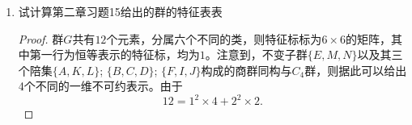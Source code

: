 \documentclass[reqno,a4paper,12pt]{amsart}
\begin{document}
\begin{enumerate}[1.]
\begin{proof}
考虑$T_z^2$在相似变换前后的矩阵形式，记$D(R) = D^T(R) \times D^T(R)$。
\[
	D(T_z^2) = \mathbf{diag}\{1,1,-1, 1,1,-1, -1,-1,1\};
\]
\[
	X^{-1}D(T_z^2)X = \mathbf{diag}\{1,1,1, -1,-1,1, -1,-1,1\}.
\]

对于$R_1$有：
\[
	X^{-1}D(R_1) X = \left( \begin{matrix}
		1 & 0 & 0 & 0 & 0 & 0 & 0 & 0 & 0 \\
		0 & \omega & 0 & 0 & 0 & 0 & 0 & 0 & 0 \\
		0 & 0 & \omega^2 & 0 & 0 & 0 & 0 & 0 & 0 \\
		0 & 0 & 0 & 0 & 0 & 1 & 0 & 0 & 0 \\
		0 & 0 & 0 & 1 & 0 & 0 & 0 & 0 & 0 \\
		0 & 0 & 0 & 0 & 1 & 0 & 0 & 0 & 0 \\
		0 & 0 & 0 & 0 & 0 & 0 & 0 & 0 & 1 \\
		0 & 0 & 0 & 0 & 0 & 0 & 1 & 0 & 0 \\
		0 & 0 & 0 & 0 & 0 & 0 & 0 & 1 & 0 \\
	\end{matrix} \right)
\]

从而可以求解得到相似变换矩阵$X$如下
\[
	X = \left( \begin{matrix}
		1 & 1 & 1 & 0 & 0 & 0 & 0 & 0 & 0 \\
		0 & 0 & 0 & 0 & 0 & 1 & 0 & 0 & 0 \\
		0 & 0 & 0 & 0 & 0 & 0 & 0 & 1 & 0 \\
		0 & 0 & 0 & 0 & 0 & 0 & 0 & 0 & 1 \\
		1 & \omega^2 & \omega & 0 & 0 & 0 & 0 & 0 & 0 \\
		0 & 0 & 0 & 1 & 0 & 0 & 0 & 0 & 0 \\
		0 & 0 & 0 & 0 & 1 & 0 & 0 & 0 & 0 \\
		0 & 0 & 0 & 0 & 0 & 0 & 1 & 0 & 0 \\
		1 & \omega & \omega^2 & 0 & 0 & 0 & 0 & 0 & 0 \\
	\end{matrix} \right)
\]
\end{proof}

\medskip

\item 试计算第二章习题15给出的群的特征表表

\begin{proof}
群$G$共有$12$个元素，分属六个不同的类，则特征标标为$6\times6$的矩阵，其中第一行为恒等表示的特征标，均为$1$。注意到，不变子群$\{E, M, N\}$以及其三个陪集$\{A, K, L\}$; $\{B, C, D\}$; $\{F, I, J\}$构成的商群同构与$C_4$群，则据此可以给出4个不同的一维不可约表示。由于
\[
	12 = 1^2\times 4 + 2^2 \times 2.
\]


\end{proof}
\end{enumerate}
\end{document}
